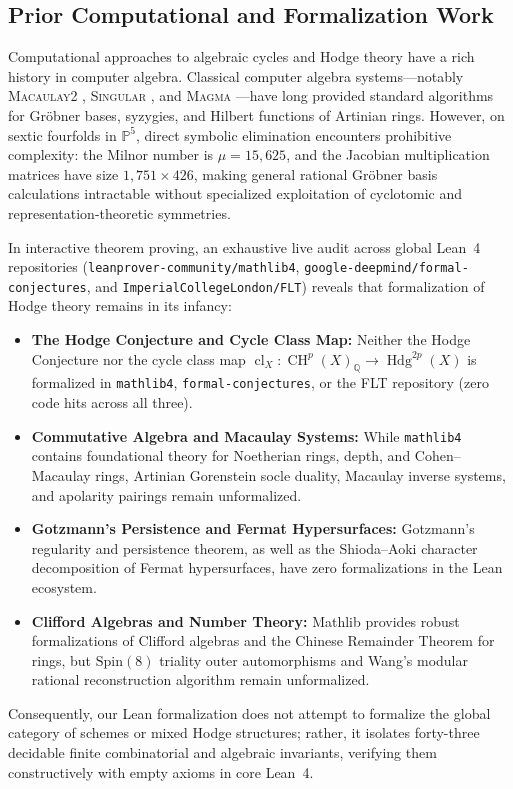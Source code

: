 \documentclass[11pt,a4paper]{article}
\theoremstyle{definition}
\theoremstyle{remark}
\DeclareMathOperator{\Hdg}{Hdg}
\DeclareMathOperator{\CH}{CH}
\DeclareMathOperator{\cl}{cl}
\begin{document}
\subsection{Prior Computational and Formalization Work}
Computational approaches to algebraic cycles and Hodge theory have a rich history in computer algebra. Classical computer algebra systems—notably \textsc{Macaulay2} \cite{GraysonStillman}, \textsc{Singular} \cite{DGPS}, and \textsc{Magma} \cite{BosmaCannonPlayoust}—have long provided standard algorithms for Gröbner bases, syzygies, and Hilbert functions of Artinian rings. However, on sextic fourfolds in $\mathbb{P}^5$, direct symbolic elimination encounters prohibitive complexity: the Milnor number is $\mu = 15,625$, and the Jacobian multiplication matrices have size $1,751 \times 426$, making general rational Gröbner basis calculations intractable without specialized exploitation of cyclotomic and representation-theoretic symmetries.

In interactive theorem proving, an exhaustive live audit across global Lean~4 repositories (\texttt{leanprover-community/mathlib4}, \texttt{google-deepmind/formal-conjectures}, and \texttt{ImperialCollegeLondon/FLT}) reveals that formalization of Hodge theory remains in its infancy:
\begin{itemize}[leftmargin=1.5em]
\item \textbf{The Hodge Conjecture and Cycle Class Map:} Neither the Hodge Conjecture nor the cycle class map $\cl_X : \CH^p(X)_{\mathbb{Q}} \to \Hdg^{2p}(X)$ is formalized in \texttt{mathlib4}, \texttt{formal-conjectures}, or the FLT repository (zero code hits across all three).
\item \textbf{Commutative Algebra and Macaulay Systems:} While \texttt{mathlib4} contains foundational theory for Noetherian rings, depth, and Cohen--Macaulay rings, Artinian Gorenstein socle duality, Macaulay inverse systems, and apolarity pairings remain unformalized.
\item \textbf{Gotzmann's Persistence and Fermat Hypersurfaces:} Gotzmann's regularity and persistence theorem, as well as the Shioda--Aoki character decomposition of Fermat hypersurfaces, have zero formalizations in the Lean ecosystem.
\item \textbf{Clifford Algebras and Number Theory:} Mathlib provides robust formalizations of Clifford algebras and the Chinese Remainder Theorem for rings, but $\mathrm{Spin}(8)$ triality outer automorphisms and Wang's modular rational reconstruction algorithm remain unformalized.
\end{itemize}
Consequently, our Lean formalization does not attempt to formalize the global category of schemes or mixed Hodge structures; rather, it isolates forty-three decidable finite combinatorial and algebraic invariants, verifying them constructively with empty axioms in core Lean~4.
\end{document}
